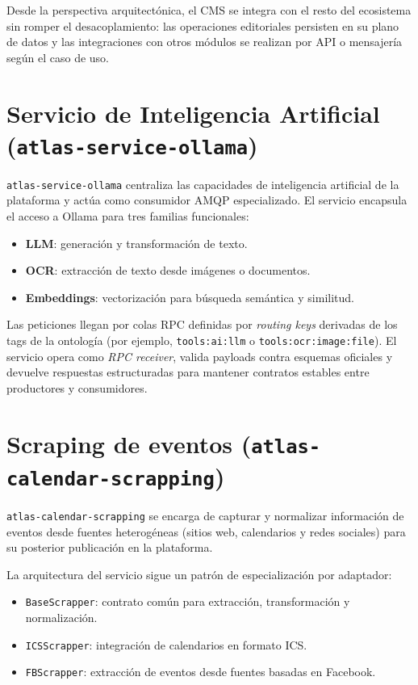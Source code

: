 Desde la perspectiva arquitectónica, el CMS se integra con el resto del ecosistema sin romper el desacoplamiento: las operaciones editoriales persisten en su plano de datos y las integraciones con otros módulos se realizan por API o mensajería según el caso de uso.

\section{Servicio de Inteligencia Artificial (\texttt{atlas-service-ollama})}

\texttt{atlas-service-ollama} centraliza las capacidades de inteligencia artificial de la plataforma y actúa como consumidor AMQP especializado. El servicio encapsula el acceso a Ollama para tres familias funcionales:

\begin{itemize}
\item \textbf{LLM}: generación y transformación de texto.
\item \textbf{OCR}: extracción de texto desde imágenes o documentos.
\item \textbf{Embeddings}: vectorización para búsqueda semántica y similitud.
\end{itemize}

Las peticiones llegan por colas RPC definidas por \textit{routing keys} derivadas de los tags de la ontología (por ejemplo, \texttt{tools:ai:llm} o \texttt{tools:ocr:image:file}). El servicio opera como \textit{RPC receiver}, valida payloads contra esquemas oficiales y devuelve respuestas estructuradas para mantener contratos estables entre productores y consumidores.

\section{Scraping de eventos (\texttt{atlas-calendar-scrapping})}

\texttt{atlas-calendar-scrapping} se encarga de capturar y normalizar información de eventos desde fuentes heterogéneas (sitios web, calendarios y redes sociales) para su posterior publicación en la plataforma.

La arquitectura del servicio sigue un patrón de especialización por adaptador:

\begin{itemize}
\item \texttt{BaseScrapper}: contrato común para extracción, transformación y normalización.
\item \texttt{ICSScrapper}: integración de calendarios en formato ICS.
\item \texttt{FBScrapper}: extracción de eventos desde fuentes basadas en Facebook.
\end{itemize}

